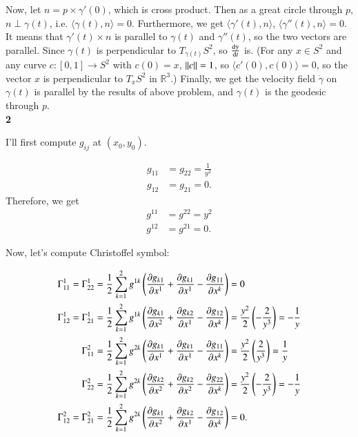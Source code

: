 \documentclass[a4paper, 12pt]{article}
\theoremstyle{Mydefinition}
\theoremstyle{Mytheorem}
\begin{document}
Now, let $n = p\times \gamma'(0)$, which is cross product. Then as a great circle through $p$, $n\perp \gamma(t)$, i.e. $\langle \gamma(t), n\rangle = 0$. Furthermore, we get $\langle \gamma'(t), n\rangle$, $\langle \gamma''(t), n\rangle = 0$. It means that $\gamma'(t)\times n$ is parallel to $\gamma(t)$ and $\gamma''(t)$, so the two vectors are parallel. Since $\gamma(t)$ is perpendicular to $T_{\gamma(t)}S^2$, so $\dv{\dot{\gamma}}{t}$ is. (For any $x\in S^2$ and any curve $c:[0,1]\rightarrow S^2$ with $c(0) = x$, $\norm{c}=1$, so $\langle c'(0), c(0)\rangle = 0$, so the vector $x$ is perpendicular to $T_x S^2$ in $\mathbb{R}^3$.) Finally, we get the velocity field $\dot{\gamma}$ on $\gamma(t)$ is parallel by the results of above problem, and $\gamma(t)$ is the geodesic through $p$.\\

\noindent \textbf{2}

I'll first compute $g_{ij}$ at $(x_0, y_0)$.

\begin{equation*}
    \begin{split}
        g_{11} &= g_{22} = \frac{1}{y^2}\\
        g_{12} &= g_{21} = 0.
    \end{split}
\end{equation*}
Therefore, we get
\begin{equation*}
    \begin{split}
        g^{11} &= g^{22} = y^2\\
        g^{12} &= g^{21} = 0.
    \end{split}
\end{equation*}

Now, let's compute Christoffel symbol:

\begin{equation*}
\begin{split}
    \Gamma_{11}^1 = \Gamma_{22}^1 &= \frac{1}{2}\sum_{k=1}^2 g^{1k}\left(\pdv{g_{k1}}{x^1}+\pdv{g_{k1}}{x^1} - \pdv{g_{11}}{x^k}\right) = 0 \\
    \Gamma_{12}^1 = \Gamma_{21}^1 &= \frac{1}{2}\sum_{k=1}^2 g^{1k}\left(\pdv{g_{k1}}{x^2}+\pdv{g_{k2}}{x^1} - \pdv{g_{12}}{x^k}\right) = \frac{y^2}{2}\left(-\frac{2}{y^3}\right) = -\frac{1}{y}\\
    \Gamma_{11}^2 &= \frac{1}{2}\sum_{k=1}^2 g^{2k}\left(\pdv{g_{k1}}{x^1}+\pdv{g_{k1}}{x^1} - \pdv{g_{11}}{x^k}\right) = \frac{y^2}{2}\left(\frac{2}{y^3}\right) = \frac{1}{y}\\
    \Gamma_{22}^2 &= \frac{1}{2}\sum_{k=1}^2 g^{2k}\left(\pdv{g_{k2}}{x^2}+\pdv{g_{k2}}{x^2} - \pdv{g_{22}}{x^k}\right) = \frac{y^2}{2}\left(-\frac{2}{y^3}\right) = -\frac{1}{y}\\
    \Gamma_{12}^2 = \Gamma_{21}^2 &= \frac{1}{2}\sum_{k=1}^2 g^{2k}\left(\pdv{g_{k1}}{x^2}+\pdv{g_{k2}}{x^1} - \pdv{g_{12}}{x^k}\right) = 0.
\end{split}
\end{equation*}
\end{document}
